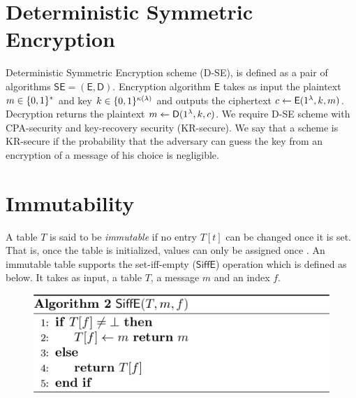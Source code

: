 \section{Deterministic Symmetric Encryption}
Deterministic Symmetric Encryption scheme (D-SE), is defined as a pair of algorithms $\mathsf{SE=(E, D)}$. Encryption algorithm $\mathsf{E}$ takes as input the plaintext $m \in \{0,1\}^*$ and key $k \in \{0,1\}^{\kappa(\lambda)}$ and outputs the ciphertext $c \leftarrow \mathsf{E}(1^{\lambda}, k, m)$. Decryption returns the plaintext $m \leftarrow \mathsf{D}(1^{\lambda}, k, c)$. \cite{imle} We require D-SE scheme with CPA-security and key-recovery security (KR-secure). We say that a scheme is KR-secure if the probability that the adversary can guess the key from an encryption of a message of his choice is negligible.

\section{Immutability}
A table $T$ is said to be \textit{immutable} if no entry $T[t]$ can be changed once it is set. That is, once the table is initialized, values can only be assigned once \cite{imle}. An immutable table supports the set-iff-empty ($\mathsf{SiffE}$) operation which is defined as below. It takes as input, a table $T$, a message $m$ and an index $f$.

\begin{figure}[H]
	\centering
	\includegraphics[scale=0.25]{SiffE}
\end{figure}


